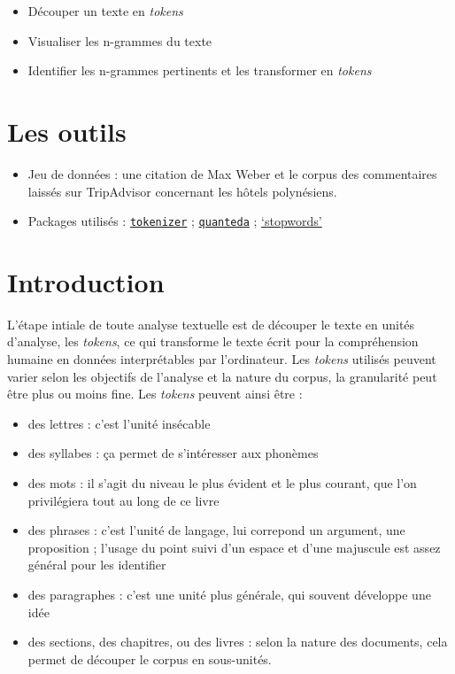 \documentclass[
]{book}
\providecommand{\tightlist}{%
  \setlength{\itemsep}{0pt}\setlength{\parskip}{0pt}}
\begin{document}
\begin{itemize}
\tightlist
\item
  Découper un texte en \emph{tokens}
\item
  Visualiser les n-grammes du texte
\item
  Identifier les n-grammes pertinents et les transformer en \emph{tokens}
\end{itemize}

\hypertarget{les-outils}{%
\section{Les outils}\label{les-outils}}

\begin{itemize}
\tightlist
\item
  Jeu de données : une citation de Max Weber et le corpus des commentaires laissés sur TripAdvisor concernant les hôtels polynésiens.
\item
  Packages utilisés : \href{https://cran.r-project.org/web/packages/tokenizers/vignettes/introduction-to-tokenizers.html}{\texttt{tokenizer}} ; \href{https://quanteda.io}{\texttt{quanteda}} ; \href{https://github.com/quanteda/stopwords}{`stopwords'}
\end{itemize}

\hypertarget{introduction}{%
\section{Introduction}\label{introduction}}

L'étape intiale de toute analyse textuelle est de découper le texte en unités d'analyse, les \emph{tokens}, ce qui transforme le texte écrit pour la compréhension humaine en données interprétables par l'ordinateur. Les \emph{tokens} utilisés peuvent varier selon les objectifs de l'analyse et la nature du corpus, la granularité peut être plus ou moins fine. Les \emph{tokens} peuvent ainsi être :

\begin{itemize}
\tightlist
\item
  des lettres : c'est l'unité insécable
\item
  des syllabes : ça permet de s'intéresser aux phonèmes
\item
  des mots : il s'agit du niveau le plus évident et le plus courant, que l'on privilégiera tout au long de ce livre
\item
  des phrases : c'est l'unité de langage, lui correpond un argument, une proposition ; l'usage du point suivi d'un espace et d'une majuscule est assez général pour les identifier
\item
  des paragraphes : c'est une unité plus générale, qui souvent développe une idée
\item
  des sections, des chapitres, ou des livres : selon la nature des documents, cela permet de découper le corpus en sous-unités.
\end{itemize}
\end{document}
